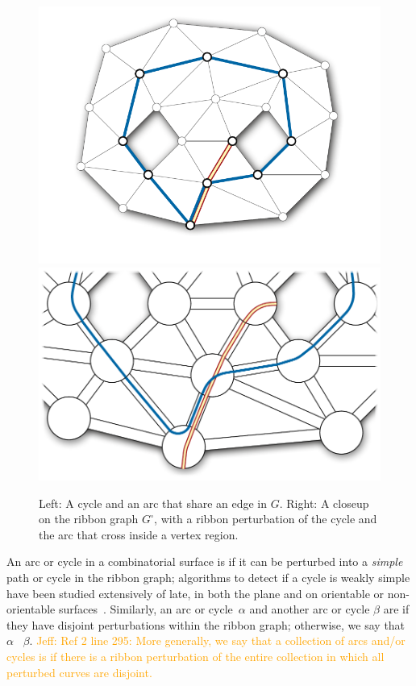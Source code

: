 \documentclass[letterpaper,review]{siamart190516}
\def\jnote#1{\textcolor{orange}{Jeff: #1}}
\begin{document}
\begin{figure}[htb]
\centering
\includegraphics[scale=0.45]{Fig/pants-ribbon}\hfil
\includegraphics[scale=0.45]{Fig/pants-ribbon-2}
\caption{Left: A cycle and an arc that share an edge in $G$.  Right: A closeup on the ribbon graph $G^\square$, with a ribbon perturbation of the cycle and the arc that cross inside a vertex region.}
\label{F:ribbon}
\end{figure}

An arc or cycle in a combinatorial surface is  if it can be perturbed into a \emph{simple} path or cycle in the ribbon graph; algorithms to detect if a cycle is weakly simple have been studied extensively of late, in both the plane and on orientable or non-orientable surfaces~\cite{cex-dwsp-15,aaet-rwsp-17}.
Similarly, an arc or cycle~$\alpha$ and another arc or cycle $\beta$ are  if they have disjoint perturbations within the ribbon graph; otherwise, we say that $\alpha$ ~$\beta$.  \jnote{Ref 2 line 295: More generally, we say that a collection of arcs and/or cycles is \EMPH{non-crossing} if there is a ribbon perturbation of the entire collection in which all perturbed curves are disjoint.}
\end{document}
